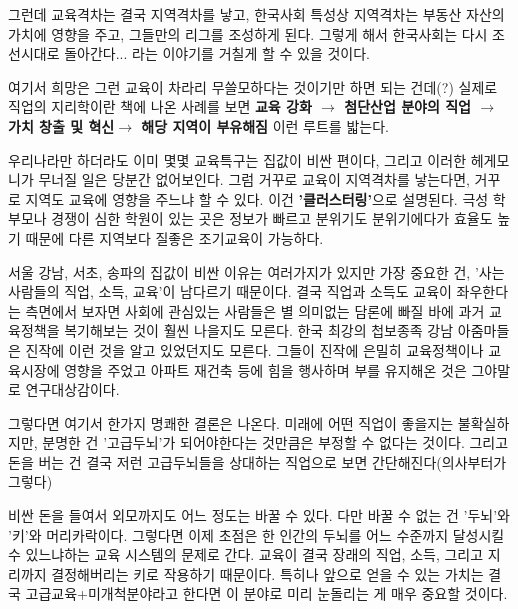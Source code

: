 그런데 교육격차는 결국 지역격차를 낳고,
한국사회 특성상 지역격차는 부동산 자산의 가치에 영향을 주고, 그들만의 리그를 조성하게 된다.
그렇게 해서 한국사회는 다시 조선시대로 돌아간다... 라는 이야기를 거칠게 할 수 있을 것이다.
\vspace{5mm}

여기서 희망은 그런 교육이 차라리 무쓸모하다는 것이기만 하면 되는 건데(?)
실제로 직업의 지리학이란 책에 나온 사례를 보면 \textbf{교육 강화  $\rightarrow$ 첨단산업 분야의 직업 $\rightarrow$ 가치 창출 및 혁신$\rightarrow$ 해당 지역이 부유해짐}
이런 루트를 밟는다.
\vspace{5mm}

우리나라만 하더라도 이미 몇몇 교육특구는 집값이 비싼 편이다, 그리고 이러한 헤게모니가 무너질 일은 당분간 없어보인다.
그럼 거꾸로 교육이 지역격차를 낳는다면, 거꾸로 지역도 교육에 영향을 주느냐 할 수 있다.
이건 \textbf{'클러스터링'}으로 설명된다.
극성 학부모나 경쟁이 심한 학원이 있는 곳은 정보가 빠르고 분위기도 분위기에다가 효율도 높기 때문에 다른 지역보다 질좋은 조기교육이 가능하다.
\vspace{5mm}

서울 강남, 서초, 송파의 집값이 비싼 이유는 여러가지가 있지만
가장 중요한 건, '사는 사람들의 직업, 소득, 교육'이 남다르기 때문이다.
결국 직업과 소득도 교육이 좌우한다는 측면에서 보자면
사회에 관심있는 사람들은 별 의미없는 담론에 빠질 바에 과거 교육정책을 복기해보는 것이 훨씬 나을지도 모른다.
한국 최강의 첩보종족 강남 아줌마들은 진작에 이런 것을 알고 있었던지도 모른다.
그들이 진작에 은밀히 교육정책이나 교육시장에 영향을 주었고 아파트 재건축 등에 힘을 행사하며 부를 유지해온 것은 그야말로 연구대상감이다.
\vspace{5mm}

그렇다면 여기서 한가지 명쾌한 결론은 나온다.
미래에 어떤 직업이 좋을지는 불확실하지만, 분명한 건 '고급두뇌'가 되어야한다는 것만큼은 부정할 수 없다는 것이다.
그리고 돈을 버는 건 결국 저런 고급두뇌들을 상대하는 직업으로 보면 간단해진다(의사부터가 그렇다)
\vspace{5mm}

비싼 돈을 들여서 외모까지도 어느 정도는 바꿀 수 있다. 다만 바꿀 수 없는 건 '두뇌'와 '키'와 머리카락이다.
그렇다면 이제 초점은 한 인간의 두뇌를 어느 수준까지 달성시킬 수 있느냐하는 교육 시스템의 문제로 간다.
교육이 결국 장래의 직업, 소득, 그리고 지리까지 결정해버리는 키로 작용하기 때문이다.
특히나 앞으로 얻을 수 있는 가치는 결국 고급교육+미개척분야라고 한다면 이 분야로 미리 눈돌리는 게 매우 중요할 것이다.
\vspace{5mm}






